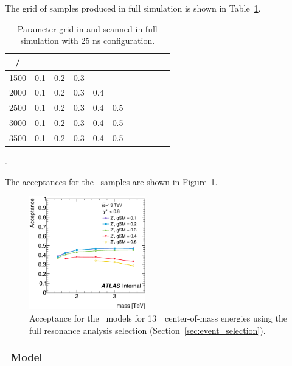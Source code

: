 The grid of samples produced in full simulation is shown in Table~\ref{tab:ZPrimeScan}.

\begin{table}[!h]
	\centering
		\begin{tabular}{| l |r r r r r r r r r r|}
			\hline
			\multicolumn{1}{|c|}{\mMed/\gev} & \multicolumn{10}{c|}{\gq} \\
			\hline
			1500   	       &         0.1  & 0.2 & 0.3 &  &  &  &  &  &  &  \\
			2000           &         0.1  & 0.2 & 0.3 & 0.4  &  &  &  &  &  &  \\
			2500           &         0.1  & 0.2 & 0.3 & 0.4 & 0.5 &  &  &  &  &  \\
			3000           &         0.1  & 0.2 & 0.3 & 0.4 & 0.5 &  &  &  &  &  \\
			3500           &         0.1  & 0.2 & 0.3 & 0.4 & 0.5 &  &  &  &  &  \\
			\hline
		\end{tabular}
	\caption{Parameter grid in \gq and \mMed scanned in full simulation with 25 ns configuration.}.
	\label{tab:ZPrimeScan}
\end{table}
 
 The acceptances %
 for the \Zprime\ samples
 are shown in Figure~\ref{fig:zprime_acc}.%

 \begin{figure}[!htb]
   \centering
   \includegraphics[width=0.45\textwidth]{figures/benchmark_signals/Acceptances_AllZPrime.eps}
   \caption{Acceptance for the \Zprime\ models 
   for 13~\TeV~center-of-mass energies using the full resonance
   analysis selection (Section~\ref{sec:event_selection}).
   \label{fig:zprime_acc}}
 \end{figure}
 
 \clearpage
\subsubsection{\Wstar\ Model}
\label{sec:Wstar}

